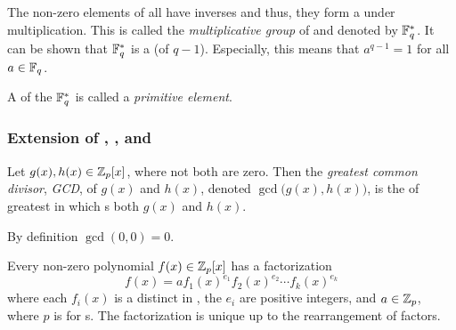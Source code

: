 \begin{definition}\label{def:Polynomial_Ring_Properties-Multiplicative_Group}
  The non-zero elements of  all have inverses and thus, they form a  under multiplication.
  This  is called the \emph{multiplicative group} of  and denoted by $\mathbb{F}_{q^{}}^{*}$.
  It can be shown that $\mathbb{F}_{q^{}}^{*}$ is a   (of  $q-1$).
  Especially, this means that $a^{q-1} = 1$ for all $a \in \mathbb{F}_{q^{}}$.
\end{definition}

\begin{definition}\label{def:Polynomial_Ring_Properties-Primitive_Element}
  A  of the   $\mathbb{F}_{q^{}}^{*}$ is called a \emph{primitive element}.
\end{definition}

\subsubsection{Extension of , , and }\label{subsubsec:Extend_GCD_Euclidean_Algorithms}
\begin{definition}\label{def:Polynomial_Ring_GCD}
  Let $g(x), h(x) \in \mathbb{Z}_{p}[x]$, where not both are zero.
  Then the \emph{greatest common divisor}, \emph{GCD}, of $g(x)$ and $h(x)$, denoted $\gcd\bigl( g(x), h(x) \bigr)$, is the  of greatest  in  which s both $g(x)$ and $h(x)$.

  \begin{remark}
    By definition $\gcd(0, 0) = 0$.
  \end{remark}
\end{definition}

\begin{theorem}\label{thm:Unique_Factorization_of_Polynomials}
  Every non-zero polynomial $f(x) \in \mathbb{Z}_{p}[x]$ has a factorization
  \begin{equation}\label{eq:Unique_Factorization_of_Polynomials}
    f(x) = a {f_{1}(x)}^{e_{1}} {f_{2}(x)}^{e_{2}} \cdots {f_{k}(x)}^{e_{k}}
  \end{equation}
  where each $f_{i}(x)$ is a distinct    in , the $e_{i}$ are positive integers, and $a \in \operatorname{\mathbb{Z}}_{p}$, where $p$ is for s.
  The factorization is unique up to the rearrangement of factors.
\end{theorem}

